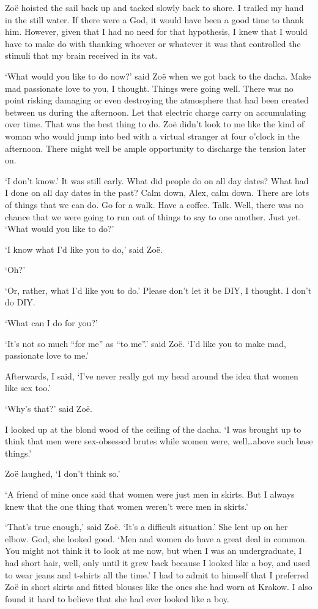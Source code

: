 Zoë hoisted the sail back up and tacked slowly back to shore. I
trailed my hand in the still water. If there were a God, it would
have been a good time to thank him. However, given that I had no
need for that hypothesis, I knew that I would have to make do with
thanking whoever or whatever it was that controlled the stimuli that
my brain received in its vat.

`What would you like to do now?' said Zoë when we got back to
the dacha. Make mad passionate love to you, I thought. Things were
going well. There was no point risking damaging or even destroying
the atmosphere that had been created between us during the
afternoon. Let that electric charge carry on accumulating over time.
That was the best thing to do. Zoë didn't look to me like the
kind of woman who would jump into bed with a virtual stranger at
four o'clock in the afternoon. There might well be ample opportunity
to discharge the tension later on.

`I don't know.' It was still early. What did people do on all day
dates? What had I done on all day dates in the past? Calm down,
Alex, calm down. There are lots of things that we can do. Go for a
walk. Have a coffee. Talk. Well, there was no chance that we were going to run out
of things to say to one another. Just yet. `What would you like to
do?'

`I know what I'd like you to do,' said Zoë.

`Oh?'

`Or, rather, what I'd like you to do.' Please don't let it be DIY, I
thought. I don't do DIY.

`What can I do for you?'

`It's not so much ``for me'' as ``to me''.' said Zoë. `I'd like
you to make mad, passionate love to me.'

Afterwards, I said, `I've never really got my head around the idea
that women like sex too.'

`Why's that?' said Zoë.

I looked up at the blond wood of the ceiling of the dacha. `I was
brought up to think that men were sex-obsessed brutes while women
were, well\dots above such base things.'

Zoë laughed, `I don't think so.'

`A friend of mine once said that women were just men in skirts. But
I always knew that the one thing that women weren't were men in
skirts.'

`That's true enough,' said Zoë. `It's a difficult situation.'
She lent up on her elbow. God, she looked good. `Men and women do
have a great deal in common. You might not think it to look at me
now, but when I was an undergraduate, I had short hair, well, only until it grew back because I looked like a boy, and used to
wear jeans and t-shirts all the time.' I had to admit to himself
that I preferred Zoë in short skirts and fitted blouses like the ones she had worn at Krakow. I also found it hard to believe that she had ever looked like a boy.


